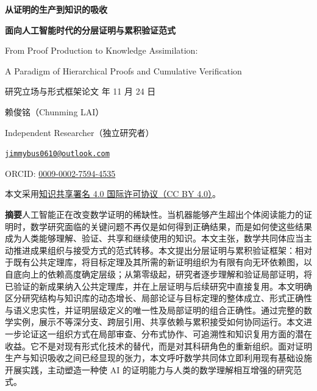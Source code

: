 \documentclass[UTF8,11pt,a4paper,fontset=fandol]{ctexart}
\theoremstyle{definition}\newtheorem{definition}{定义}
\begin{document}
\thispagestyle{plain}
\begin{center}
\vspace*{8mm}
{\fontsize{24}{32}\selectfont\bfseries 从证明的生产到知识的吸收\par}
\vspace{4mm}
{\Large\bfseries 面向人工智能时代的分层证明与累积验证范式\par}
\vspace{5mm}
{\large From Proof Production to Knowledge Assimilation:\par A Paradigm of Hierarchical Proofs and Cumulative Verification\par}
\vspace{5mm}
{\small 研究立场与形式框架论文 年 11 月 24 日\par}
{\large 赖俊铭（Chunming LAI）\par}
{\small Independent Researcher（独立研究者）\par}
{\small \href{mailto:jimmybus0610@outlook.com}{\texttt{jimmybus0610@outlook.com}}\par}
{\small ORCID: \href{https://orcid.org/0009-0002-7594-4535}{0009-0002-7594-4535}\par}
\vspace{2mm}
{\small 本文采用\href{https://creativecommons.org/licenses/by/4.0/}{知识共享署名 4.0 国际许可协议（CC BY 4.0）}。\par}
\end{center}
\vspace{4mm}
\noindent\textbf{摘要}\quad 人工智能正在改变数学证明的稀缺性。当机器能够产生超出个体阅读能力的证明时，数学研究面临的关键问题不再仅是如何得到正确结果，而是如何使这些结果成为人类能够理解、验证、共享和继续使用的知识。本文主张，数学共同体应当主动推进成果组织与接受方式的范式转移。本文提出分层证明与累积验证框架：相对于既有公共定理库，将目标定理及其所需的新证明组织为有限有向无环依赖图，以自底向上的依赖高度确定层级；从第零级起，研究者逐步理解和验证局部证明，将已验证的新成果纳入公共定理库，并在上层证明与后续研究中直接复用。本文明确区分研究结构与知识库的动态增长、局部论证与目标定理的整体成立、形式正确性与语义忠实性，并证明层级定义的唯一性及局部证明的组合正确性。通过完整的数学实例，展示不等深分支、跨层引用、共享依赖与累积接受如何协同运行。本文进一步论证这一组织方式在局部审查、分布式协作、可追溯性和知识复用方面的潜在收益。它不是对现有形式化技术的替代，而是对其科研角色的重新组织。面对证明生产与知识吸收之间已经显现的张力，本文呼吁数学共同体立即利用现有基础设施开展实践，主动塑造一种使 AI 的证明能力与人类的数学理解相互增强的研究范式。
\end{document}
